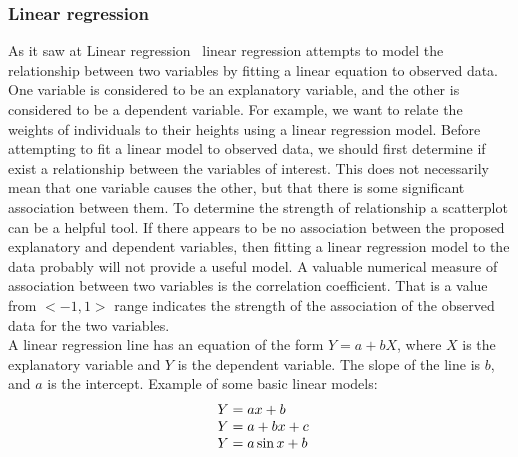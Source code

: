 \subsubsection{Linear regression} \label{sec:linear}
As it saw at Linear regression~\cite{linear} linear regression attempts to model the relationship between two variables by fitting a linear equation to observed data.
One variable is considered to be an explanatory variable, and the other is considered to be a dependent variable.
For example, we want to relate the weights of individuals to their heights using a linear regression model.
Before attempting to fit a linear model to observed data, we should first determine if exist a relationship between the variables of interest.
This does not necessarily mean that one variable causes the other, but that there is some significant association between them.
To determine the strength of relationship a scatterplot can be a helpful tool.
If there appears to be no association between the proposed explanatory and dependent variables, then fitting a linear regression
model to the data probably will not provide a useful model.
A valuable numerical measure of association between two variables is the correlation coefficient.
That is a value from $<-1, 1>$ range indicates the strength of the association of the observed data for the two variables.\\
A linear regression line has an equation of the form $Y = a + bX$, where $X$ is the explanatory variable and $Y$ is the dependent variable.
The slope of the line is $b$, and $a$ is the intercept.
Example of some basic linear models:\\
\begin{equation} \label{eq:lin}
\begin{array}{l@{}l}
	Y = ax + b\\
	Y = a + bx + c\\
	Y = a\sin x + b\\
\end{array}
\end{equation}

